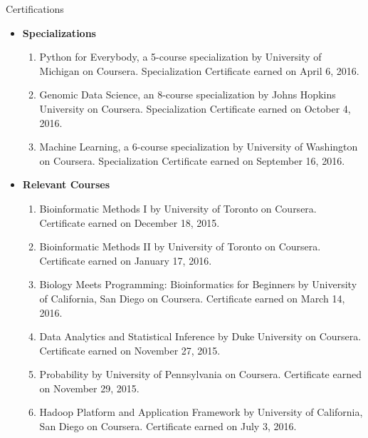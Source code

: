 \documentclass{resume} %
\begin{document}
\begin{rSection}{Certifications}
\begin{itemize}
\item \noindent \textbf{Specializations}
\begin{enumerate}
\item \noindent Python for Everybody, a 5-course specialization by University of Michigan on Coursera. Specialization Certificate earned on April 6, 2016.
\item \noindent Genomic Data Science, an 8-course specialization by Johns Hopkins University on Coursera. Specialization Certificate earned on October 4, 2016.
\item \noindent Machine Learning, a 6-course specialization by University of Washington on Coursera. Specialization Certificate earned on September 16, 2016.
\end{enumerate}
\item \noindent \textbf{Relevant Courses}
\begin{enumerate}
\item  Bioinformatic Methods I by University of Toronto on Coursera. Certificate earned on December 18, 2015.
\item  Bioinformatic Methods II by University of Toronto on Coursera. Certificate earned on January 17, 2016.
\item  Biology Meets Programming: Bioinformatics for Beginners by University of California, San Diego on Coursera. Certificate earned on March 14, 2016.
\item Data Analytics and Statistical Inference by Duke University on Coursera. Certificate earned on November 27, 2015.
\item Probability by University of Pennsylvania on Coursera. Certificate earned on November 29, 2015.
\item Hadoop Platform and Application Framework by University of California, San Diego on Coursera. Certificate earned on July 3, 2016.
\end{enumerate}
\end{itemize}
\end{rSection}
\end{document}
